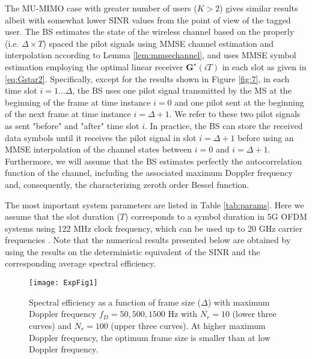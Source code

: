 \documentclass[conference, a4paper, 10pt]{IEEEtran}
\newcommand{\mx}[1]{\mathbf{#1}}
\begin{document}
The \ac{MU-MIMO} case with greater number of users ($K>2$) gives similar results
albeit with somewhat lower \ac{SINR} values from the point of view of the tagged user.
The \ac{BS} estimates the state of the wireless channel based on
the properly (i.e. $\Delta \times T$) spaced the pilot signals using \ac{MMSE} channel estimation and interpolation according to Lemma \ref{lem:mmsechannel}, and uses \ac{MMSE}
symbol estimation employing the optimal linear receiver $\mx{G}^\star(i T)$ in each slot as given in \eqref{eq:Gstar2}.
Specifically, except for the results shown in Figure \ref{fig:7},
in each time slot $i=1 \dots \Delta$, the \ac{BS} uses one pilot signal transmitted by the \ac{MS} at the
beginning of the frame at time instance $i=0$ and one pilot sent at the beginning of the next frame at time
instance $i=\Delta+1$. We refer to these two pilot signals as sent "before" and "after" time slot $i$.
In practice, the \ac{BS} can store the received data symbols until it receives the pilot signal in slot
$i=\Delta+1$ before using an \ac{MMSE} interpolation of the channel states between $i=0$ and $i=\Delta+1$.
Furthermore,
we will assume that the \ac{BS} estimates
perfectly the autocorrelation function of the channel, including the associated maximum Doppler frequency
and, consequently, the characterizing zeroth order Bessel function.
\begin{comment}
Since many previous works used an \ac{AR}(1) approximation of the fast fading channel, Figure \ref{fig:8} examines
the case, in which the \ac{BS} assumes that the channel is AR(1) (although the actual channel is characterized by
a Doppler-dependent Bessel autocorrelation function) or when the \ac{BS} underestimates or overestimates the
actual Doppler frequency.
\end{comment}
The most important system parameters are listed in Table \ref{tab:params}.
Here we assume that the slot duration ($T$) corresponds to a symbol duration in
5G \ac{OFDM} systems using 122 MHz clock frequency, which can be used up to 20 GHz
carrier frequencies \cite{Zaidi:16}.
Note that the numerical results presented below are obtained by using the %
results on the deterministic equivalent of the \ac{SINR} and the corresponding average spectral efficiency.

\begin{figure}[t]
\begin{center}
\texttt{[image: ExpFig1]}
\caption{
Spectral efficiency as a function of frame size ($\Delta$) with maximum Doppler frequency
$f_D=50, 500, 1500$ Hz with $N_r=10$ (lower three curves) and $N_r=100$ (upper three curves).
At higher maximum Doppler frequency, the optimum frame size is smaller than at low Doppler
frequency.
}
\label{fig:1}
\end{center}
\end{figure}
\end{document}
